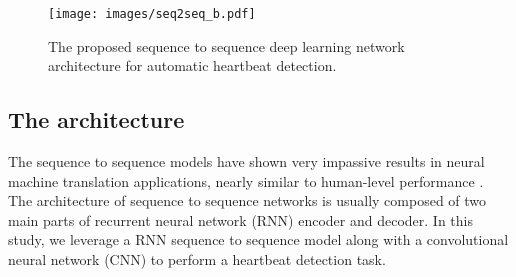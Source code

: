 \documentclass{article}
\begin{document}
\begin{table}[h]  
\caption{ Categories of heartbeats existed in the
MIT-BIH database based on AAMI.}
\end{table}



\begin{figure*}[htb]
\centering
\texttt{[image: images/seq2seq\_b.pdf]}
  \caption{The proposed sequence to sequence deep learning network architecture for automatic heartbeat detection.} 
  \label{fig:final-model}
\end{figure*}

\subsection{The architecture}
The sequence to sequence models have shown very impassive results in neural machine translation applications, nearly similar to human-level performance \cite{johnson2016google}. 
The architecture of sequence to sequence networks is usually composed of two main parts of recurrent neural network (RNN) encoder and decoder. In this study, we leverage a RNN sequence to sequence model along with a convolutional neural network (CNN) to perform a heartbeat detection task. 
\end{document}
